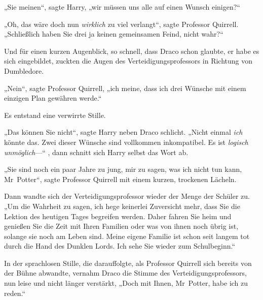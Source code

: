 „Sie meinen“, sagte Harry, „wir müssen uns alle auf einen Wunsch einigen?“

„Oh, das wäre doch nun \emph{wirklich} zu viel verlangt“, sagte Professor Quirrell. „Schließlich haben Sie drei ja keinen gemeinsamen Feind, nicht wahr?“

Und für einen kurzen Augenblick, so schnell, dass Draco schon glaubte, er habe es sich eingebildet, zuckten die Augen des Verteidigungsprofessors in Richtung von Dumbledore.

„Nein“, sagte Professor Quirrell, „ich meine, dass ich drei Wünsche mit einem einzigen Plan gewähren werde.“

Es entstand eine verwirrte Stille.

„Das können Sie nicht“, sagte Harry neben Draco schlicht. „Nicht einmal \emph{ich} könnte das. Zwei dieser Wünsche sind vollkommen inkompatibel. Es ist \emph{logisch unmöglich}—“ , dann schnitt sich Harry selbst das Wort ab.

„Sie sind noch ein paar Jahre zu jung, mir zu sagen, was ich nicht tun kann, Mr~Potter“, sagte Professor Quirrell mit einem kurzen, trockenen Lächeln.

Dann wandte sich der Verteidigungsprofessor wieder der Menge der Schüler zu. „Um die Wahrheit zu sagen, ich hege keinerlei Zuversicht mehr, dass Sie die Lektion des heutigen Tages begreifen werden. Daher fahren Sie heim und genießen Sie die Zeit mit Ihren Familien oder was von ihnen noch übrig ist, solange sie noch am Leben sind. Meine eigene Familie ist schon seit langem tot durch die Hand des Dunklen Lords. Ich sehe Sie wieder zum Schulbeginn.“

In der sprachlosen Stille, die darauffolgte, als Professor Quirrell sich bereits von der Bühne abwandte, vernahm Draco die Stimme des Verteidigungsprofessors, nun leise und nicht länger verstärkt, „Doch mit Ihnen, Mr~Potter, habe ich zu reden.“

